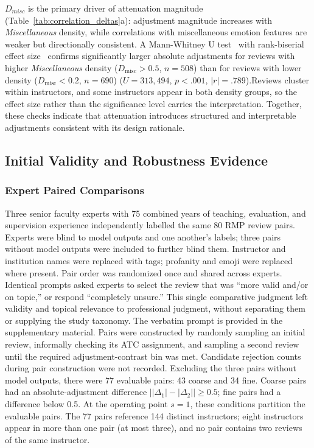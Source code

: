 \documentclass[fleqn,10pt]{JLA_article}
\let\cite\shortcite
\begin{document}
$D_{misc}$ is the primary driver of attenuation magnitude (Table~\ref{tab:correlation_deltas}a): adjustment magnitude increases with \textit{Miscellaneous} density, while correlations with miscellaneous emotion features are weaker but directionally consistent. A Mann-Whitney U test~\cite{MannWhitney1947} with rank-biserial effect size~\cite{Cureton1956} confirms significantly larger absolute adjustments for reviews with higher \textit{Miscellaneous} density ($D_{\text{misc}} > 0.5$, $n=508$) than for reviews with lower density ($D_{\text{misc}} < 0.2$, $n=690$) ($U = 313{,}494$, $p < .001$, $|r| = .789$).Reviews cluster within instructors, and some instructors appear in both
density groups, so the effect size rather than the significance level carries
the interpretation. Together, these checks indicate that attenuation introduces structured and interpretable adjustments consistent with its design rationale.

\subsection{Initial Validity and Robustness Evidence}

\subsubsection{Expert Paired Comparisons}

Three senior faculty experts with 75 combined years of teaching, evaluation, and supervision experience independently labelled the same 80 RMP review pairs. Experts were blind to model outputs and one another's labels; three pairs without model outputs were included to further blind them. Instructor and institution names were replaced with tags; profanity and emoji were replaced where present. Pair order was randomized once and shared across experts. Identical prompts asked experts to select the review that was ``more valid and/or on topic,'' or respond ``completely unsure.'' This single comparative judgment left validity and topical relevance to professional judgment, without separating them or supplying the study taxonomy. The verbatim prompt is provided in the supplementary material. Pairs were constructed by randomly sampling an initial review, informally checking its ATC assignment, and sampling a second review until the required adjustment-contrast bin was met. Candidate rejection counts during pair construction were not recorded. Excluding the three pairs without model outputs, there were 77 evaluable pairs: 43 coarse and 34 fine. Coarse pairs had an absolute-adjustment difference $\bigl||\Delta_1|-|\Delta_2|\bigr| \geq 0.5$; fine pairs had a difference below 0.5. At the operating point $s=1$, these conditions partition the evaluable pairs. The 77 pairs reference 144 distinct instructors; eight instructors appear in more than one pair (at most three), and no pair contains two reviews of the same instructor.
\end{document}
